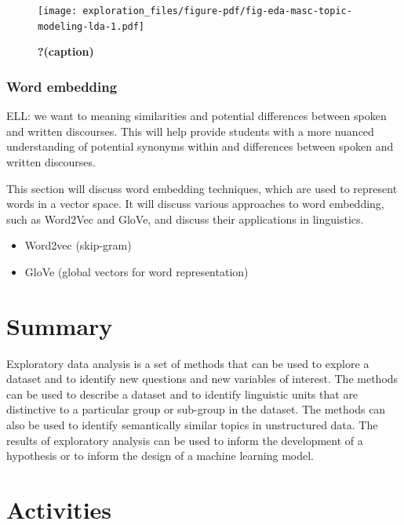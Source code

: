 \documentclass[
  letterpaper,
  DIV=11,
  numbers=noendperiod]{scrreport}
\providecommand{\tightlist}{%
  \setlength{\itemsep}{0pt}\setlength{\parskip}{0pt}}\usepackage{longtable,booktabs,array}
\theoremstyle{definition}
\theoremstyle{remark}
\begin{document}
\begin{figure}[H]

{\centering \texttt{[image: exploration\_files/figure-pdf/fig-eda-masc-topic-modeling-lda-1.pdf]}

}

\caption{\label{fig-eda-masc-topic-modeling-lda}\textbf{?(caption)}}

\end{figure}

\hypertarget{sec-eda-word-embedding}{%
\subsubsection{Word embedding}\label{sec-eda-word-embedding}}

ELL: we want to meaning similarities and potential differences between
spoken and written discourses. This will help provide students with a
more nuanced understanding of potential synonyms within and differences
between spoken and written discourses.

This section will discuss word embedding techniques, which are used to
represent words in a vector space. It will discuss various approaches to
word embedding, such as Word2Vec and GloVe, and discuss their
applications in linguistics.

\begin{itemize}
\tightlist
\item
  Word2vec (skip-gram)
\item
  GloVe (global vectors for word representation)
\end{itemize}

\hypertarget{summary-7}{%
\section{Summary}\label{summary-7}}

Exploratory data analysis is a set of methods that can be used to
explore a dataset and to identify new questions and new variables of
interest. The methods can be used to describe a dataset and to identify
linguistic units that are distinctive to a particular group or sub-group
in the dataset. The methods can also be used to identify semantically
similar topics in unstructured data. The results of exploratory analysis
can be used to inform the development of a hypothesis or to inform the
design of a machine learning model.

\hypertarget{activities-6}{%
\section*{Activities}\label{activities-6}}
\end{document}
